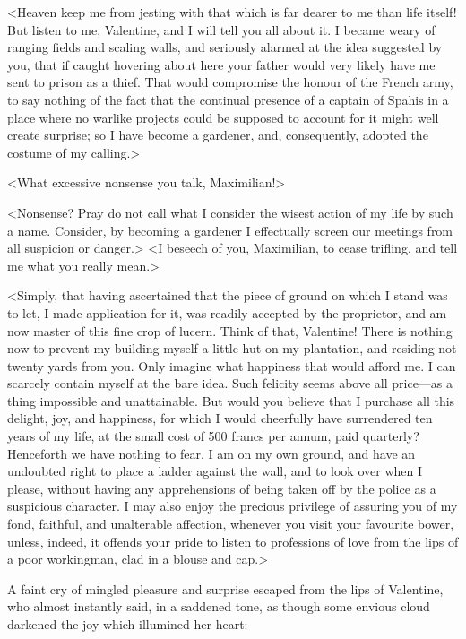  <Heaven keep me from jesting with that which is far dearer to me than life itself! But listen to me, Valentine, and I will tell you all about it. I became weary of ranging fields and scaling walls, and seriously alarmed at the idea suggested by you, that if caught hovering about here your father would very likely have me sent to prison as a thief. That would compromise the honour of the French army, to say nothing of the fact that the continual presence of a captain of Spahis in a place where no warlike projects could be supposed to account for it might well create surprise; so I have become a gardener, and, consequently, adopted the costume of my calling.> 

 <What excessive nonsense you talk, Maximilian!> 

 <Nonsense? Pray do not call what I consider the wisest action of my life by such a name. Consider, by becoming a gardener I effectually screen our meetings from all suspicion or danger.>  <I beseech of you, Maximilian, to cease trifling, and tell me what you really mean.> 

 <Simply, that having ascertained that the piece of ground on which I stand was to let, I made application for it, was readily accepted by the proprietor, and am now master of this fine crop of lucern. Think of that, Valentine! There is nothing now to prevent my building myself a little hut on my plantation, and residing not twenty yards from you. Only imagine what happiness that would afford me. I can scarcely contain myself at the bare idea. Such felicity seems above all price—as a thing impossible and unattainable. But would you believe that I purchase all this delight, joy, and happiness, for which I would cheerfully have surrendered ten years of my life, at the small cost of 500 francs per annum, paid quarterly? Henceforth we have nothing to fear. I am on my own ground, and have an undoubted right to place a ladder against the wall, and to look over when I please, without having any apprehensions of being taken off by the police as a suspicious character. I may also enjoy the precious privilege of assuring you of my fond, faithful, and unalterable affection, whenever you visit your favourite bower, unless, indeed, it offends your pride to listen to professions of love from the lips of a poor workingman, clad in a blouse and cap.> 

 A faint cry of mingled pleasure and surprise escaped from the lips of Valentine, who almost instantly said, in a saddened tone, as though some envious cloud darkened the joy which illumined her heart: 


